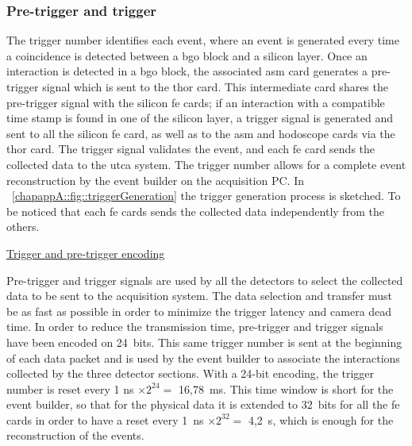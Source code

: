 
\subsubsection{Pre-trigger and trigger}\label{chapappA::subsubsec::trigger}
The trigger number identifies each event, where an event is generated every time a coincidence is detected between a \gls{bgo} block and a silicon layer. Once an interaction is detected in a \gls{bgo} block, the associated \gls{asm} card generates a pre-trigger signal which is sent to the \gls{thor} card. This intermediate card shares the pre-trigger signal with the silicon \gls{fe} cards; if an interaction with a compatible time stamp is found in one of the silicon layer, a trigger signal is generated and sent to all the silicon \gls{fe} card, as well as to the \gls{asm} and hodoscope cards via the \gls{thor} card. The trigger signal validates the event, and each \gls{fe} card sends the collected data to the \gls{utca} system. The trigger number allows for a complete event reconstruction by the event builder on the acquisition PC. In \figurename~\ref{chapappA::fig::triggerGeneration} the trigger generation process is sketched.\newline
To be noticed that each \gls{fe} cards sends the collected data independently from the others.\newline


\underline{Trigger and pre-trigger encoding}\newline

Pre-trigger and trigger signals are used by all the detectors to select the collected data to be sent to the acquisition system. The data selection and transfer must be as fast as possible in order to minimize the trigger latency and camera dead time. In order to reduce the transmission time, pre-trigger and trigger signals have been encoded on 24~bits.\newline
This same trigger number is sent at the beginning of each data packet and is used by the event builder to associate the interactions collected by the three detector sections. With a 24-bit encoding, the trigger number is reset every 1 ns $\times \mathrm{2^{24}} =$ 16,78~ms. This time window is short for the event builder, so that for the physical data it is extended to 32~bits for all the \gls{fe} cards in order to have a reset every 1~ns $\times \mathrm{2^{32}} =$ 4,2~s, which is enough for the reconstruction of the events.

